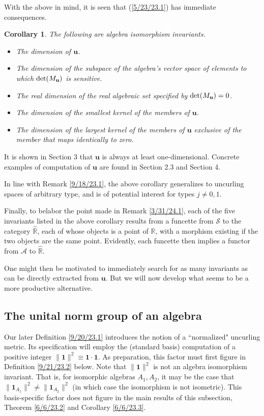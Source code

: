 \documentclass{amsart}
\numberwithin{equation}{section}
\newtheorem{corollary}[theorem]{Corollary}
\theoremstyle{definition}
\numberwithin{theorem}{section}
\begin{document}
   With the above in mind, it is seen that (\ref{5/23/23.1}) has immediate consequences.
        
        
      
  \begin{corollary}\label{8/18/23.2} The following are algebra isomorphism invariants. \begin{itemize} \item The dimension of $\mathbf{u}$. \item The dimension of the subspace of the algebra's vector space of elements to which ${\rm det}(M_{\mathbf{u}})$ is sensitive. \item The real dimension of the real algebraic set specified by ${\rm det}(M_{\mathbf{u}}) = 0$. \item The dimension of the smallest kernel of the members of $\mathbf{u}$.  \item The dimension of the largest kernel of the members of $\mathbf{u}$ exclusive of the member that maps identically to zero.\end{itemize} \end{corollary}

 It is shown in Section 3 that $\mathbf{u}$ is always at least one-dimensional.   Concrete examples of computation of $\mathbf{u}$ are found in Section 2.3 and Section 4.  
 
In line with Remark \ref{9/18/23.1}, the above corollary generalizes to uncurling spaces of arbitrary type, and is of potential interest for types $j\ne 0,1$.

Finally, to belabor the point made in Remark \ref{3/31/24.1}, each of the five invariants listed in the above corollary results from a funcette from $\mathcal{S}$ to the category $\widehat{\mathbb{R}}$, each of whose objects is a point of $\mathbb{R}$, with a morphism existing if the two objects are the same point.  Evidently, each funcette then implies a functor from $\mathcal{A}$ to $\widehat{\mathbb{R}}$.  

One might then be motivated to immediately search for as many invariants as can be directly extracted from $\mathbf{u}$.  But we will now develop what seems to be a more productive alternative.


\subsection{The unital norm group of an algebra}
  
Our later Definition \ref{9/20/23.1} introduces the notion of a ``normalized" uncurling metric.  Its specification will employ the (standard basis) computation of a positive integer $\|\mathbf{1}\|^2 \equiv \mathbf{1} \cdot \mathbf{1}$. As preparation, this factor must first figure in Definition \ref{9/21/23.2} below.   Note that $\|\mathbf{1}\|^2$ is not an algebra isomorphism invariant.  That is, for isomorphic algebras $A_1,A_2$, it may be the case that $\|\mathbf{1}_{A_1}\|^2 \ne \|\mathbf{1}_{A_2}\|^2$ (in which case the isomorphism is not isometric).  This basis-specific factor does not figure in the main results of this subsection, Theorem \ref{6/6/23.2} and Corollary \ref{6/6/23.3}.
\end{document}

